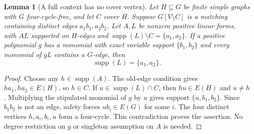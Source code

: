 \documentclass[11pt]{article}
\newcommand{\supp}{\operatorname{supp}}
\newtheorem{lemma}[theorem]{Lemma}
\theoremstyle{definition}
\theoremstyle{remark}
\begin{document}
\begin{lemma}[A full context has no cover vertex]\label{lem:contextsupport}
Let $H\subseteq G$ be finite simple graphs with $G$ four-cycle-free, and let $C$ cover $H$. Suppose $G[V\setminus C]$ is a matching containing distinct edges $a_1b_1,a_2b_2$. Let $A,L$ be nonzero positive linear forms, with $AL$ supported on $H$-edges and $\supp(L)\setminus C=\{a_1,a_2\}$. If a positive polynomial $g$ has a monomial with exact variable support $\{b_1,b_2\}$ and every monomial of $gL$ contains a $G$-edge, then
\[
 \supp(L)=\{a_1,a_2\}.
\]
\end{lemma}
\begin{proof}
Choose any $h\in\supp(A)$. The old-edge condition gives $ha_1,ha_2\in E(H)$, so $h\in C$. If $u\in\supp(L)\cap C$, then $hu\in E(H)$ and $u\ne h$. Multiplying the stipulated monomial of $g$ by $u$ gives support $\{u,b_1,b_2\}$. Since $b_1b_2$ is not an edge, safety forces $ub_i\in E(G)$ for some $i$. The four distinct vertices $h,a_i,b_i,u$ form a four-cycle. This contradiction proves the assertion. No degree restriction on $g$ or singleton assumption on $A$ is needed.
\end{proof}
\end{document}
